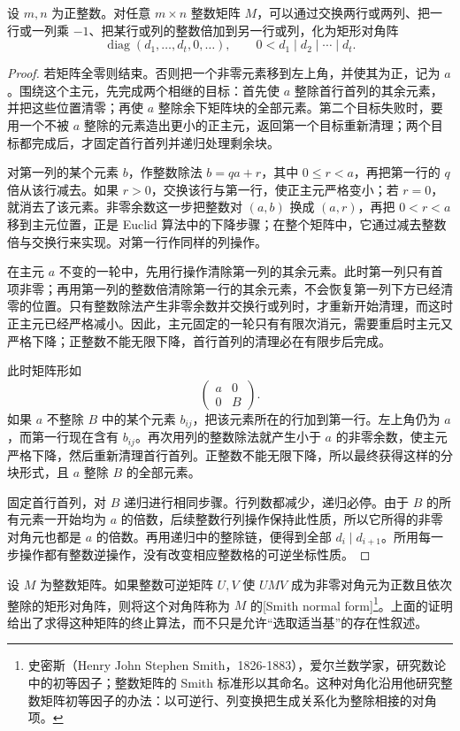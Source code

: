 \begin{lemma}\label{b1:lem:smith-integer}
	设 \(m,n\) 为正整数。对任意 \(m\times n\) 整数矩阵 \(M\)，可以通过交换两行或两列、把一行或一列乘 \(-1\)、把某行或列的整数倍加到另一行或列，化为矩形对角阵
	\[
		\operatorname{diag}(d_1,\ldots,d_t,0,\ldots), \qquad 0<d_1\mid d_2\mid\cdots\mid d_t.
	\]
\end{lemma}
\begin{proof}
	若矩阵全零则结束。否则把一个非零元素移到左上角，并使其为正，记为 \(a\)。围绕这个主元，先完成两个相继的目标：首先使 \(a\) 整除首行首列的其余元素，并把这些位置清零；再使 \(a\) 整除余下矩阵块的全部元素。第二个目标失败时，要用一个不被 \(a\) 整除的元素造出更小的正主元，返回第一个目标重新清理；两个目标都完成后，才固定首行首列并递归处理剩余块。

	对第一列的某个元素 \(b\)，作整数除法 \(b=qa+r\)，其中 \(0\le r<a\)，再把第一行的 \(q\) 倍从该行减去。如果 \(r>0\)，交换该行与第一行，使正主元严格变小；若 \(r=0\)，就消去了该元素。非零余数这一步把整数对 \((a,b)\) 换成 \((a,r)\)，再把 \(0<r<a\) 移到主元位置，正是 Euclid 算法中的下降步骤；在整个矩阵中，它通过减去整数倍与交换行来实现。对第一行作同样的列操作。

	在主元 \(a\) 不变的一轮中，先用行操作清除第一列的其余元素。此时第一列只有首项非零；再用第一列的整数倍清除第一行的其余元素，不会恢复第一列下方已经清零的位置。只有整数除法产生非零余数并交换行或列时，才重新开始清理，而这时正主元已经严格减小。因此，主元固定的一轮只有有限次消元，需要重启时主元又严格下降；正整数不能无限下降，首行首列的清理必在有限步后完成。

	此时矩阵形如
	\[
		\begin{pmatrix}a&0\\0&B\end{pmatrix}.
	\]
	如果 \(a\) 不整除 \(B\) 中的某个元素 \(b_{ij}\)，把该元素所在的行加到第一行。左上角仍为 \(a\)，而第一行现在含有 \(b_{ij}\)。再次用列的整数除法就产生小于 \(a\) 的非零余数，使主元严格下降，然后重新清理首行首列。正整数不能无限下降，所以最终获得这样的分块形式，且 \(a\) 整除 \(B\) 的全部元素。

	固定首行首列，对 \(B\) 递归进行相同步骤。行列数都减少，递归必停。由于 \(B\) 的所有元素一开始均为 \(a\) 的倍数，后续整数行列操作保持此性质，所以它所得的非零对角元也都是 \(a\) 的倍数。再用递归中的整除链，便得到全部 \(d_i\mid d_{i+1}\)。所用每一步操作都有整数逆操作，没有改变相应整数格的可逆坐标性质。
\end{proof}

设 \(M\) 为整数矩阵。如果整数可逆矩阵 \(U,V\) 使 \(UMV\) 成为非零对角元为正数且依次整除的矩形对角阵，则将这个对角阵称为 \(M\) 的[Smith normal form]\footnote{史密斯（Henry John Stephen Smith，1826-1883），爱尔兰数学家，研究数论中的初等因子；整数矩阵的 Smith 标准形以其命名。这种对角化沿用他研究整数矩阵初等因子的办法：以可逆行、列变换把生成关系化为整除相接的对角项。}。上面的证明给出了求得这种矩阵的终止算法，而不只是允许“选取适当基”的存在性叙述。

